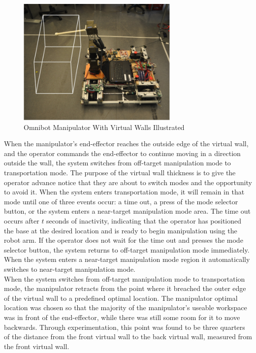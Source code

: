 \documentclass[onecolumn,10pt,final]{asme2ej}
\begin{document}
\begin{figure}[htbp!]
    \centering
    \includegraphics[width=0.7\textwidth]{wallbox.png}
    \caption{Omnibot Manipulator With Virtual Walls Illustrated}
    \label{fig:vwalls}
\end{figure} 

When the manipulator's end-effector reaches the outside edge of the virtual wall, and the operator commands the end-effector to continue moving in a direction outside the wall, the system switches from off-target manipulation mode to transportation mode. The purpose of the virtual wall thickness is to give the operator advance notice that they are about to switch modes and the opportunity to avoid it. When the system enters transportation mode, it will remain in that mode until one of three events occur: a time out, a press of the mode selector button, or the system enters a near-target manipulation mode area. The time out occurs after $t$ seconds of inactivity, indicating that the operator has positioned the base at the desired location and is ready to begin manipulation using the robot arm. If the operator does not wait for the time out and presses the mode selector button, the system returns to off-target manipulation mode immediately. When the system enters a near-target manipulation mode region it automatically switches to near-target manipulation mode.\\

When the system switches from off-target manipulation mode to transportation mode, the manipulator retracts from the point where it breached the outer edge of the virtual wall to a predefined optimal location. The manipulator optimal location was chosen so that the majority of the manipulator's useable workspace was in front of the end-effector, while there was still some room for it to move backwards. Through experimentation, this point was found to be three quarters of the distance from the front virtual wall to the back virtual wall, measured from the front virtual wall.\\
\end{document}
